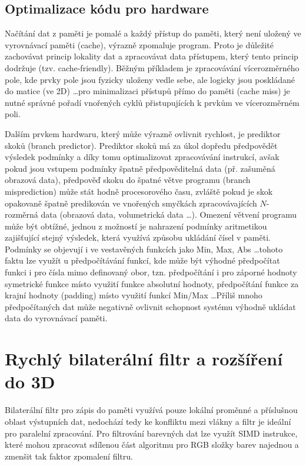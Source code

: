 \subsection*{Optimalizace kódu pro hardware}
Načítání dat z paměti je pomalé a každý přístup do paměti, který není uložený ve vyrovnávací paměti (cache), výrazně zpomaluje program. Proto je důležité zachovávat princip lokality dat a zpracovávat data přístupem, který tento princip dodržuje (tzv. cache-friendly). Běžným příkladem je zpracovávání vícerozměrného pole, kde prvky pole jsou fyzicky uloženy vedle sebe, ale logicky jsou poskládané do matice (ve 2D) \dots pro minimalizaci přístupů přímo do paměti (cache miss) je nutné správné pořadí vnořených cyklů přistupujících k prvkům ve vícerozměrném poli.

Dalším prvkem hardwaru, který může výrazně ovlivnit rychlost, je prediktor skoků (branch predictor). Prediktor skoků má za úkol dopředu předpovědět výsledek podmínky a díky tomu optimalizovat zpracovávání instrukcí, avšak pokud jsou vstupem podmínky špatně předpověditelná data (př. zašuměná obrazová data), předpověď skoku do špatné větve programu (branch misprediction) může stát hodně procesorového času, zvláště pokud je skok opakovaně špatně predikován ve vnořených smyčkách zpracovávajících $N$-rozměrná data (obrazová data, volumetrická data \dots). Omezení větvení programu může být obtížné, jednou z možností je nahrazení podmínky aritmetikou zajišťující stejný výsledek, která využívá způsobu ukládání čísel v paměti. Podmínky se objevují i ve vestavěných funkcích jako Min, Max, Abs \dots tohoto faktu lze využít u předpočítávání funkcí, kde může být výhodné předpočítat funkci i pro čísla mimo definovaný obor, tzn. předpočítání i pro záporné hodnoty symetrické funkce místo využití funkce absolutní hodnoty, předpočítání funkce za krajní hodnoty (padding) místo využití funkcí Min/Max \dots Příliš mnoho předpočítaných dat může negativně ovlivnit schopnost systému výhodně ukládat data do vyrovnávací paměti.

\newpage

\section{Rychlý bilaterální filtr a rozšíření do 3D}
\label{sec:design:bl}
Bilaterální filtr pro zápis do paměti využívá pouze lokální proměnné a příslušnou oblast výstupních dat, nedochází tedy ke konfliktu mezi vlákny a filtr je ideální pro paralelní zpracování. Pro filtrování barevných dat lze využít SIMD instrukce, které mohou zpracovat sdílenou část algoritmu pro RGB složky barev najednou a zmenšit tak faktor zpomalení filtru. 

